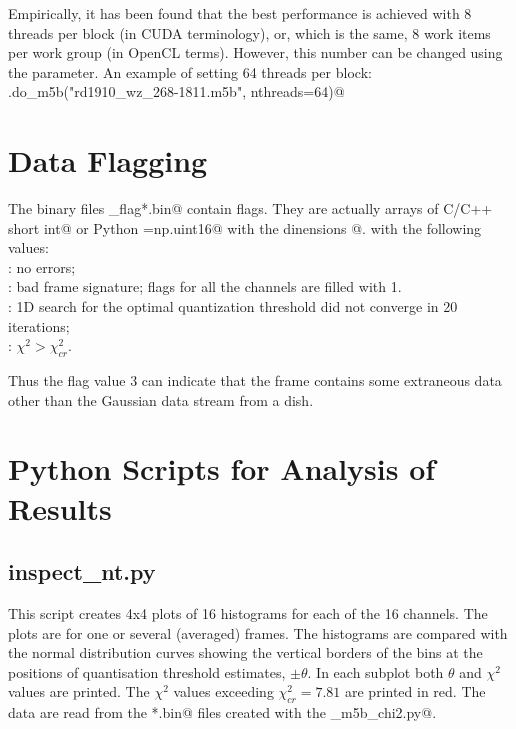 \documentclass[letterpaper,twoside,12pt]{article}
\begin{document}
Empirically, it has been found that the best performance is achieved 
with 8 threads per block (in CUDA terminology), or, which is the same, 
8 work items per work group (in OpenCL terms). However, this number can 
be changed using the \verb@nthreads@ parameter. An example of setting 64 threads per block: \\

\noindent \verb@nt.do_m5b("rd1910_wz_268-1811.m5b", nthreads=64)@ \\


\section{Data Flagging}

The binary files \verb@nt_flag*.bin@ contain flags. They are actually arrays of C/C++ \verb@unsigned short int@ or Python \verb@dtype=np.uint16@ with the dinensions \verb@[n_frames,16]@.
 with the following values: \\
 
: no errors; \\
: bad frame signature; flags for all the channels are filled with 1.  \\
: 1D search for the optimal quantization threshold did not converge in 20 iterations; \\
: $\chi^2 > \chi^2_{cr}$.

Thus the flag value 3 can indicate that the frame contains some extraneous data other than the Gaussian data stream from a dish. 


\section{Python Scripts for Analysis of Results}

\subsection{inspect\_nt.py}

This script creates 4x4 plots of 16 histograms for each of the 16 channels. The plots are for one or several (averaged) frames. The histograms are compared with the normal distribution curves showing the vertical borders of the bins at the positions of quantisation threshold estimates, $\pm\theta$. In each subplot both $\theta$ and $\chi^2$ values are printed. The $\chi^2$ values exceeding $\chi^2_{cr} = 7.81$ are printed in red. The data are read from the \verb@*.bin@ files created with the \verb@gpu_m5b_chi2.py@. \\
\end{document}
